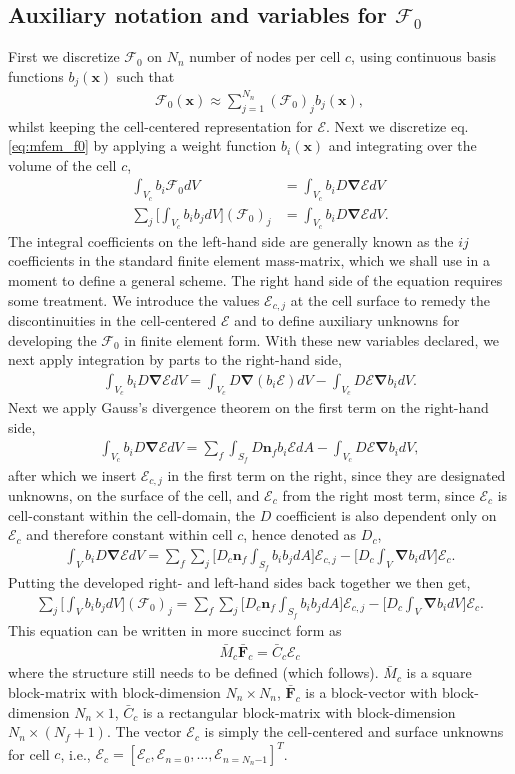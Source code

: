 \documentclass[10pt,letterpaper,notitlepage]{article}
\numberwithin{equation}{section}
\newcommand{\bnabla}{\boldsymbol{\nabla}}
\newcommand{\position}{\mathbf{x}}
\newcommand{\RadE}{\mathcal{E}}
\newcommand{\RadF}{\boldsymbol{\mathcal{F}}}
\newcommand{\RadJ}{\RadF_0}
\newcommand{\beqn}{\begin{equation}\begin{aligned}}
\newcommand{\eeqn}{\end{aligned}\end{equation}}
\begin{document}
\subsection{Auxiliary notation and variables for $\RadJ$}
First we discretize $\RadJ$ on $N_{n}$ number of nodes per cell $c$, using continuous basis functions $b_j(\position)$ such that
\beqn 
\RadJ (\position) \approx  \sum_{j=1}^{N_n} (\RadJ)_j b_j(\position),
\eeqn 
whilst keeping the cell-centered representation for $\RadE$.
Next we discretize eq. \eqref{eq:mfem_f0} by applying a weight function $b_i(\position)$ and integrating over the volume of the cell $c$,
\beqn 
\int_{V_c} b_i \RadJ dV &= \int_{V_c} b_i D \bnabla \RadE dV \\
\sum_j \biggr[ \int_{V_c} b_i b_j dV \biggr] (\RadJ)_j &= \int_{V_c} b_i D \bnabla \RadE dV.
\eeqn 
The integral coefficients on the left-hand side are generally known as the $ij$ coefficients in the standard finite element mass-matrix, which we shall use in a moment to define a general scheme. The right hand side of the equation requires some treatment. We introduce the values $\RadE_{c,j}$ at the cell surface to remedy the discontinuities in the cell-centered $\RadE$ and to define auxiliary unknowns for developing the $\RadJ$ in finite element form. With these new variables declared, we next apply integration by parts to the right-hand side,
\beqn
\int_{V_c} b_i D \bnabla \RadE dV
= \int_{V_c} D \bnabla (b_i \RadE) dV - \int_{V_c} D\RadE \bnabla b_i dV.
\eeqn 
Next we apply Gauss's divergence theorem on the first term on the right-hand side,
\beqn 
\int_{V_c} b_i D \bnabla \RadE dV
= \sum_f \int_{S_f} D \mathbf{n}_f  b_i \RadE dA - \int_{V_c} D\RadE \bnabla b_i dV,
\eeqn 
after which we insert $\RadE_{c,j}$ in the first term on the right, since they are designated unknowns, on the surface of the cell, and $\RadE_c$ from the right most term, since $\RadE_c$ is cell-constant within the cell-domain, the $D$ coefficient is also dependent only on $\RadE_c$ and therefore constant within cell $c$, hence denoted as $D_c$,
\beqn
\int_V b_i D \bnabla \RadE dV
= \sum_f  \sum_j \biggr[ D_c \mathbf{n}_f \int_{S_f}  b_i b_j dA \biggr] \RadE_{c,j} 
- \biggr[ D_c \int_V  \bnabla b_i dV \biggr] \RadE_c.
\eeqn 
Putting the developed right- and left-hand sides back together we then get,
\beqn 
\sum_j \biggr[ \int_V b_i b_j dV \biggr] (\RadJ)_j = 
\sum_f \sum_j \biggr[ D_c \mathbf{n}_f  \int_{S_f}  b_i b_jdA \biggr]\RadE_{c,j}
- \biggr[ D_c \int_V \bnabla b_i dV \biggr] \RadE_c.
\eeqn 
 This equation can be written in more succinct form as
 \beqn 
 \bar{M}_c \bar{\mathbf{F}}_c = \bar{C}_c \boldsymbol{\RadE}_c
 \eeqn 
 where the structure still needs to be defined (which follows). $\bar{M}_c$ is a square block-matrix with block-dimension $N_n{\times}N_n$, $\bar{\mathbf{F}}_c$ is a block-vector with block-dimension $N_n{\times}1$, $\bar{C}_c$ is a rectangular block-matrix with block-dimension $N_n{\times}(N_f+1)$. The vector $\boldsymbol{\RadE}_c$ is simply the cell-centered and surface unknowns for cell $c$, i.e., $\boldsymbol{\RadE}_c = [\RadE_c, \RadE_{n=0}, \dots, \RadE_{n=N_n{-1}}]^T$.
 
\end{document}
